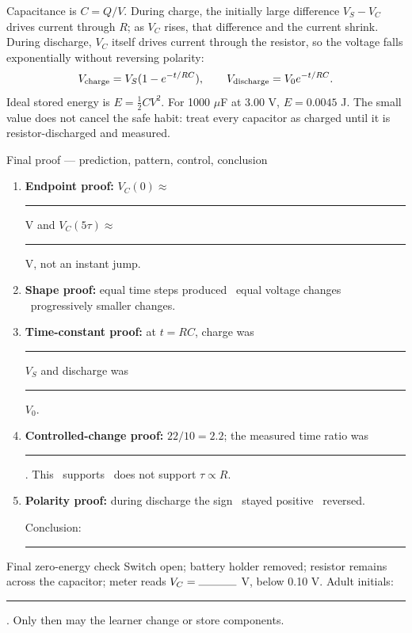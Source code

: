 Capacitance is \(C=Q/V\). During charge, the initially large difference
\(V_S-V_C\) drives current through \(R\); as \(V_C\) rises, that difference and
the current shrink. During discharge, \(V_C\) itself drives current through the
resistor, so the voltage falls exponentially without reversing polarity:
\[
V_{\rm charge}=V_S(1-e^{-t/RC}),\qquad
V_{\rm discharge}=V_0e^{-t/RC}.
\]
Ideal stored energy is \(E=\tfrac12CV^2\). For 1000 \(\mu\)F at 3.00 V,
\(E=0.0045\) J. The small value does not cancel the safe habit: treat every
capacitor as charged until it is resistor-discharged and measured.

\begin{teloscard}{Final proof — prediction, pattern, control, conclusion}
\begin{enumerate}[itemsep=.08em,topsep=.08em]
\item \textbf{Endpoint proof:} \(V_C(0)\approx\) \rule{1cm}{.3pt} V and
  \(V_C(5\tau)\approx\) \rule{1cm}{.3pt} V, not an instant jump.
\item \textbf{Shape proof:} equal time steps produced
  \checkoff\ equal voltage changes \quad \checkoff\ progressively smaller changes.
\item \textbf{Time-constant proof:} at \(t=RC\), charge was
  \rule{1cm}{.3pt}\(V_S\) and discharge was \rule{1cm}{.3pt}\(V_0\).
\item \textbf{Controlled-change proof:} \(22/10=2.2\); the measured time ratio
  was \rule{1cm}{.3pt}. This \checkoff\ supports \quad \checkoff\ does not support
  \(\tau\propto R\).
\item \textbf{Polarity proof:} during discharge the sign
  \checkoff\ stayed positive \quad \checkoff\ reversed.
  \par\noindent Conclusion: \rule{.76\linewidth}{.3pt}
\end{enumerate}
\end{teloscard}

\begin{gate}{Final zero-energy check}
Switch open; battery holder removed; resistor remains across the capacitor;
meter reads \(V_C=\rule{1.2cm}{.3pt}\) V, below 0.10 V. Adult initials:
\rule{1.2cm}{.3pt}. Only then may the learner change or store components.
\end{gate}

\endgroup

